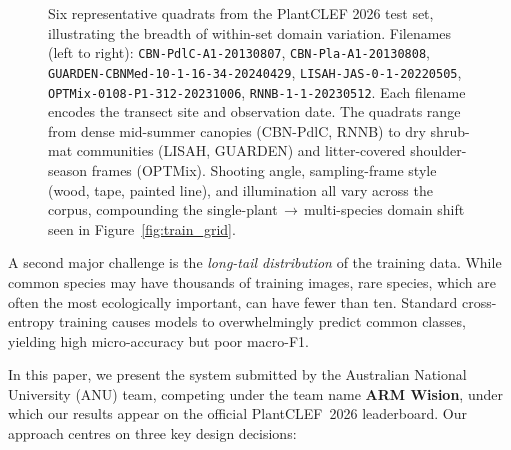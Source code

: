 \begin{figure}[t]
  \centering
  \resizebox{0.92\linewidth}{!}{}
  \caption{Six representative quadrats from the PlantCLEF 2026 test set, illustrating the breadth of within-set domain variation. Filenames (left to right): \texttt{CBN-PdlC-A1-20130807}, \texttt{CBN-Pla-A1-20130808}, \texttt{GUARDEN-CBNMed-10-1-16-34-20240429}, \texttt{LISAH-JAS-0-1-20220505}, \texttt{OPTMix-0108-P1-312-20231006}, \texttt{RNNB-1-1-20230512}. Each filename encodes the transect site and observation date. The quadrats range from dense mid-summer canopies (CBN-PdlC, RNNB) to dry shrub-mat communities (LISAH, GUARDEN) and litter-covered shoulder-season frames (OPTMix). Shooting angle, sampling-frame style (wood, tape, painted line), and illumination all vary across the corpus, compounding the single-plant\,$\to$\,multi-species domain shift seen in Figure~\ref{fig:train_grid}.}
  \label{fig:quadrats}
\end{figure}

A second major challenge is the \emph{long-tail distribution} of the training data. While common species may have thousands of training images, rare species, which are often the most ecologically important, can have fewer than ten. Standard cross-entropy training causes models to overwhelmingly predict common classes, yielding high micro-accuracy but poor macro-F1.

In this paper, we present the system submitted by the Australian National University (ANU) team, competing under the team name \textbf{ARM Wision}, under which our results appear on the official PlantCLEF~2026 leaderboard. Our approach centres on three key design decisions:

